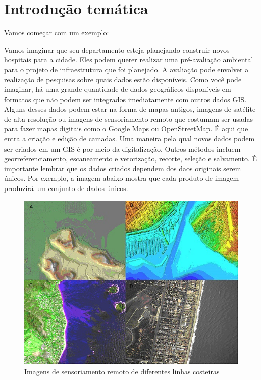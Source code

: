 \documentclass[
  portuguese,
]{krantz}
\begin{document}
\hypertarget{introduuxe7uxe3o-temuxe1tica-6}{%
\section{Introdução temática}\label{introduuxe7uxe3o-temuxe1tica-6}}

Vamos começar com um exemplo:

Vamos imaginar que seu departamento esteja planejando construir novos hospitais para a cidade. Eles podem querer realizar uma pré-avaliação ambiental para o projeto de infraestrutura que foi planejado. A avaliação pode envolver a realização de pesquisas sobre quais dados estão disponíveis. Como você pode imaginar, há uma grande quantidade de dados geográficos disponíveis em formatos que não podem ser integrados imediatamente com outros dados GIS. Alguns desses dados podem estar na forma de mapas antigos, imagens de satélite de alta resolução ou imagens de sensoriamento remoto que costumam ser usadas para fazer mapas digitais como o Google Maps ou OpenStreetMap. É aqui que entra a criação e edição de camadas. Uma maneira pela qual novos dados podem ser criados em um GIS é por meio da digitalização. Outros métodos incluem georreferenciamento, escaneamento e vetorização, recorte, seleção e salvamento. É importante lembrar que os dados criados dependem dos daos originais serem únicos. Por exemplo, a imagem abaixo mostra que cada produto de imagem produzirá um conjunto de dados únicos.

\begin{figure}
\centering
\includegraphics{media/modulo7/rs-images.png}
\caption{Imagens de sensoriamento remoto de diferentes linhas costeiras}
\end{figure}
\end{document}
